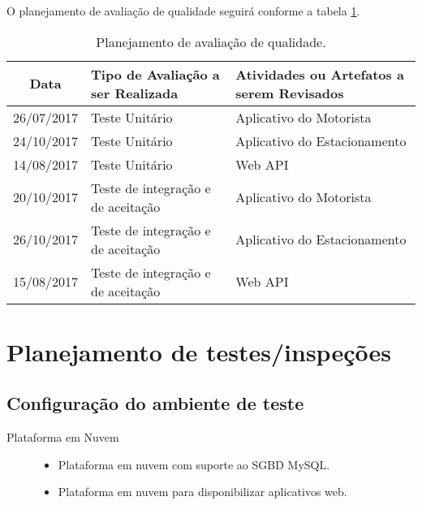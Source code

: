 O planejamento de avaliação de qualidade seguirá conforme a tabela \ref{tab:quality-evaluation-plan}.

\begin{table}[h]
	\begin{tabularx}{.9\textwidth}{| c | X | X |}
		\hline
		\textbf{Data} & \textbf{Tipo de Avaliação a ser Realizada} & \textbf{Atividades ou Artefatos a serem Revisados} \\
		\hline
		26/07/2017    & Teste Unitário                              & Aplicativo do Motorista                            \\
		\hline
		24/10/2017    & Teste Unitário                              & Aplicativo do Estacionamento                       \\
		\hline
		14/08/2017    & Teste Unitário                              & Web API                        \\
		\hline
		20/10/2017    & Teste de integração e de aceitação                        & Aplicativo do Motorista                            \\
		\hline
		26/10/2017    & Teste de integração e de aceitação                        & Aplicativo do Estacionamento                       \\
		\hline
		15/08/2017    & Teste de integração e de aceitação                        & Web API                        \\
		\hline
	\end{tabularx}
	\centering
	\caption{Planejamento de avaliação de qualidade.}
	\label{tab:quality-evaluation-plan}
\end{table}

\section{Planejamento de testes/inspeções}

\subsection{Configuração do ambiente de teste}

\begin{description}
	\item[Plataforma em Nuvem] \hfill
	\begin{itemize}
		\item Plataforma em nuvem com suporte ao SGBD MySQL.
		\item Plataforma em nuvem para disponibilizar aplicativos web.
	\end{itemize}
\end{description}

